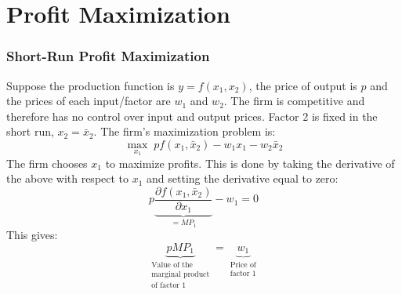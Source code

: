 \documentclass{article}
\begin{document}
\section{Profit Maximization}
\subsubsection*{Short-Run Profit Maximization}
Suppose the production function is $y=f\left( x_1,x_2 \right)$, the price of output is $p$ and the prices of each input/factor are $w_1$ and $w_2$. The firm is competitive and therefore has no control over input and output prices.  Factor 2 is fixed in the short run, $x_2=\bar{x}_2$. The firm's maximization problem is:
\[
  \underset{x_1}{\max}\; pf\left( x_1,\bar{x}_2 \right) - w_1x_1 - w_2\bar{x}_2
\]
The firm chooses $x_1$ to maximize profits. This is done by taking the derivative of the above with respect to $x_1$ and setting the derivative equal to zero:
\[
  p\underbrace{\frac{\partial f\left( x_1,\bar{x}_2 \right)}{\partial x_1}}_{=MP_1} - w_1 =0
\]
This gives:
\[
  \underbrace{pMP_1}_{\substack{\text{Value of the} \\ \text{marginal product}
  \\ \text{of factor 1}}}
  = \underbrace{w_1}_{\substack{\text{Price of} \\ \text{factor 1}}}
\]
\end{document}
